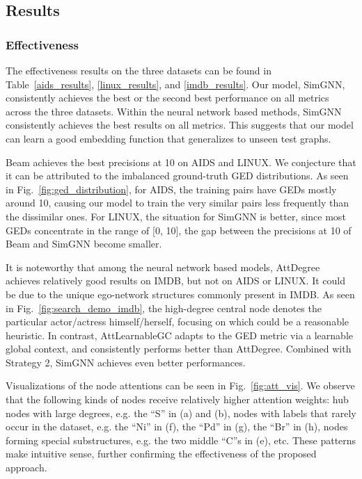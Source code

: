 \documentclass[sigconf]{acmart}
\begin{document}
\subsection{Results}

\subsubsection{Effectiveness}

The effectiveness results on the three datasets can be found in Table~\ref{aids_results}, \ref{linux_results}, and \ref{imdb_results}. Our model, SimGNN, consistently achieves the best or the second best performance on all metrics across the three datasets. Within the neural network based methods, SimGNN consistently achieves the best results on all metrics. This suggests that our model can learn a good embedding function that generalizes to unseen test graphs.

Beam achieves the best precisions at 10 on AIDS and LINUX. We conjecture that it can be attributed to the imbalanced ground-truth GED distributions. As seen in Fig.~\ref{fig:ged_distribution}, for AIDS, the training pairs have GEDs mostly around 10, causing our model to train the very similar pairs less frequently than the dissimilar ones. For LINUX, the situation for SimGNN is better, since most GEDs concentrate in the range of [0, 10], the gap between the precisions at 10 of Beam and SimGNN become smaller.

It is noteworthy that among the neural network based models, AttDegree achieves relatively good results on IMDB, but not on AIDS or LINUX. It could be due to the unique ego-network structures commonly present in IMDB. As seen in Fig.~\ref{fig:search_demo_imdb}, the high-degree central node denotes the particular actor/actress himself/herself, focusing on which could be a reasonable heuristic. In contrast, AttLearnableGC adapts to the GED metric via a learnable global context, and consistently performs better than AttDegree. Combined with Strategy 2, SimGNN achieves even better performances.

Visualizations of the node attentions can be seen in Fig.~\ref{fig:att_vis}. We observe that the following kinds of nodes receive relatively higher attention weights: hub nodes with large degrees, e.g. the ``S'' in (a) and (b), nodes with labels that rarely occur in the dataset, e.g. the ``Ni'' in (f), the ``Pd'' in (g), the ``Br'' in (h), nodes forming special substructures, e.g. the two middle ``C''s in (e), etc. These patterns make intuitive sense, further confirming the effectiveness of the proposed approach.
\end{document}
